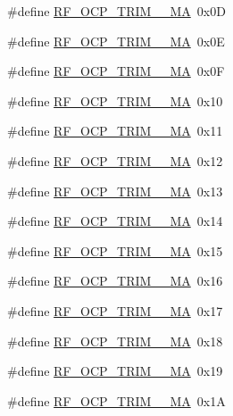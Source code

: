 \begin{DoxyCompactItemize}
\item 
\#define \mbox{\hyperlink{sx1276_regs-_fsk_8h_aec4e8936c74d0338b33f7c5201a13007}{R\+F\+\_\+\+O\+C\+P\+\_\+\+T\+R\+I\+M\+\_\+\_\+\+MA}}~0x0D
\item 
\#define \mbox{\hyperlink{sx1276_regs-_fsk_8h_ac48e4dd5062ac350432eadd140ba12fe}{R\+F\+\_\+\+O\+C\+P\+\_\+\+T\+R\+I\+M\+\_\+\_\+\+MA}}~0x0E
\item 
\#define \mbox{\hyperlink{sx1276_regs-_fsk_8h_abc2ff6a69d2a51ea5b724ca790af57bc}{R\+F\+\_\+\+O\+C\+P\+\_\+\+T\+R\+I\+M\+\_\+\_\+\+MA}}~0x0F
\item 
\#define \mbox{\hyperlink{sx1276_regs-_fsk_8h_a86b4c20cd2573e3fa003699d26e9dec5}{R\+F\+\_\+\+O\+C\+P\+\_\+\+T\+R\+I\+M\+\_\+\_\+\+MA}}~0x10
\item 
\#define \mbox{\hyperlink{sx1276_regs-_fsk_8h_ac7e461bc044a8ce5c11b3c944da839a0}{R\+F\+\_\+\+O\+C\+P\+\_\+\+T\+R\+I\+M\+\_\+\_\+\+MA}}~0x11
\item 
\#define \mbox{\hyperlink{sx1276_regs-_fsk_8h_a353421d2bcb86f0e10738e847ee7cc33}{R\+F\+\_\+\+O\+C\+P\+\_\+\+T\+R\+I\+M\+\_\+\_\+\+MA}}~0x12
\item 
\#define \mbox{\hyperlink{sx1276_regs-_fsk_8h_aff8239a2ad3878879cafc1766f7706df}{R\+F\+\_\+\+O\+C\+P\+\_\+\+T\+R\+I\+M\+\_\+\_\+\+MA}}~0x13
\item 
\#define \mbox{\hyperlink{sx1276_regs-_fsk_8h_a71ddc55ff41ffa8eed9f84918e12f8d2}{R\+F\+\_\+\+O\+C\+P\+\_\+\+T\+R\+I\+M\+\_\+\_\+\+MA}}~0x14
\item 
\#define \mbox{\hyperlink{sx1276_regs-_fsk_8h_a45b10e117bee9e321a4b5addb46a45f8}{R\+F\+\_\+\+O\+C\+P\+\_\+\+T\+R\+I\+M\+\_\+\_\+\+MA}}~0x15
\item 
\#define \mbox{\hyperlink{sx1276_regs-_fsk_8h_a80d19cc2e70d7f878ee824f9ce0b0b8b}{R\+F\+\_\+\+O\+C\+P\+\_\+\+T\+R\+I\+M\+\_\+\_\+\+MA}}~0x16
\item 
\#define \mbox{\hyperlink{sx1276_regs-_fsk_8h_a5b9812e1a3678664f64af0c4bf22cf96}{R\+F\+\_\+\+O\+C\+P\+\_\+\+T\+R\+I\+M\+\_\+\_\+\+MA}}~0x17
\item 
\#define \mbox{\hyperlink{sx1276_regs-_fsk_8h_a03e5de0e6f345d7c6f813fe49a2f3a8d}{R\+F\+\_\+\+O\+C\+P\+\_\+\+T\+R\+I\+M\+\_\+\_\+\+MA}}~0x18
\item 
\#define \mbox{\hyperlink{sx1276_regs-_fsk_8h_a5857beccb0e3c2c875d33b7644ae7849}{R\+F\+\_\+\+O\+C\+P\+\_\+\+T\+R\+I\+M\+\_\+\_\+\+MA}}~0x19
\item 
\#define \mbox{\hyperlink{sx1276_regs-_fsk_8h_a87f10f8656ea5d103c7f4df386d1c8b6}{R\+F\+\_\+\+O\+C\+P\+\_\+\+T\+R\+I\+M\+\_\+\_\+\+MA}}~0x1A

\end{DoxyCompactItemize}
